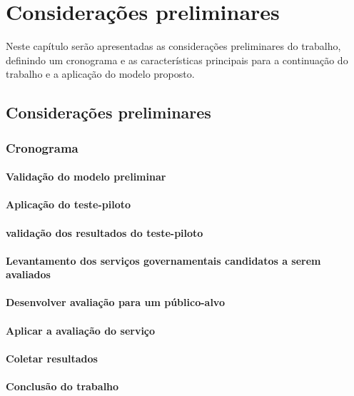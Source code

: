 \chapter[Considerações preliminares]{Considerações preliminares}
Neste capítulo serão apresentadas as considerações preliminares do trabalho, definindo um cronograma e as características principais para a continuação do trabalho e a aplicação do modelo proposto.
\section{Considerações preliminares}
	\subsection{Cronograma}
		\subsubsection{Validação do modelo preliminar}
		\subsubsection{Aplicação do teste-piloto}
		\subsubsection{validação dos resultados do teste-piloto}
		\subsubsection{Levantamento dos serviços governamentais candidatos a serem avaliados}
		\subsubsection{Desenvolver avaliação para um público-alvo}
		\subsubsection{Aplicar a avaliação do serviço}
		\subsubsection{Coletar resultados}
		\subsubsection{Conclusão do trabalho}
